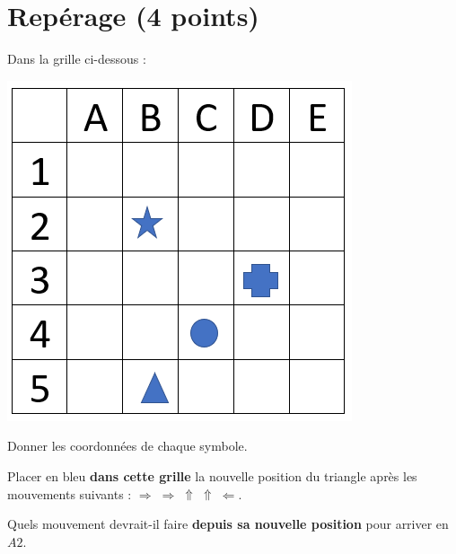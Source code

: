 \section{Repérage (4 points)}

Dans la grille ci-dessous :

\begin{multicols}{2}
	\includegraphics[scale=0.5]{img/grille}
	
	\begin{questions}
		\question[1] Donner les coordonnées de chaque symbole.
		
		\question[1\half] Placer en bleu \textbf{dans cette grille} la nouvelle position du triangle après les mouvements suivants :  {\Large $\Rightarrow \; \Rightarrow \; \Uparrow  \; \Uparrow \; \Leftarrow$}.
		
		\question[1\half] Quels mouvement devrait-il faire \textbf{depuis sa nouvelle position} pour arriver en $A2$.
	\end{questions}
\end{multicols}

